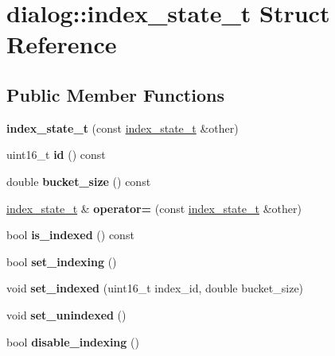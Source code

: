 \hypertarget{structdialog_1_1index__state__t}{}\section{dialog\+:\+:index\+\_\+state\+\_\+t Struct Reference}
\label{structdialog_1_1index__state__t}
\subsection*{Public Member Functions}
\begin{DoxyCompactItemize}
\item 
\mbox{\label{structdialog_1_1index__state__t_ac38405add8bd8b66b2928664bdd7c696}} 
{\bfseries index\+\_\+state\+\_\+t} (const \hyperlink{structdialog_1_1index__state__t}{index\+\_\+state\+\_\+t} \&other)
\item 
\mbox{\label{structdialog_1_1index__state__t_aff76391ea873aff7d838213b10b21e36}} 
uint16\+\_\+t {\bfseries id} () const
\item 
\mbox{\label{structdialog_1_1index__state__t_ad557a16acaf934c90111dabcc09a07bf}} 
double {\bfseries bucket\+\_\+size} () const
\item 
\mbox{\label{structdialog_1_1index__state__t_a6f353cf653f4d775cfbdb8f0f0fff147}} 
\hyperlink{structdialog_1_1index__state__t}{index\+\_\+state\+\_\+t} \& {\bfseries operator=} (const \hyperlink{structdialog_1_1index__state__t}{index\+\_\+state\+\_\+t} \&other)
\item 
\mbox{\label{structdialog_1_1index__state__t_a5e49771c6f5cf27ce5b99f04f9c3f1cf}} 
bool {\bfseries is\+\_\+indexed} () const
\item 
\mbox{\label{structdialog_1_1index__state__t_ae638a88966b1addedc9ed771261afa21}} 
bool {\bfseries set\+\_\+indexing} ()
\item 
\mbox{\label{structdialog_1_1index__state__t_a2c51ccfb0ca81842091ff050586f80b7}} 
void {\bfseries set\+\_\+indexed} (uint16\+\_\+t index\+\_\+id, double bucket\+\_\+size)
\item 
\mbox{\label{structdialog_1_1index__state__t_a8970c11a3b6bc3324f5f6348b6e52547}} 
void {\bfseries set\+\_\+unindexed} ()
\item 
\mbox{\label{structdialog_1_1index__state__t_ac2b94de0879937a02049b989993903e9}} 
bool {\bfseries disable\+\_\+indexing} ()
\end{DoxyCompactItemize}
